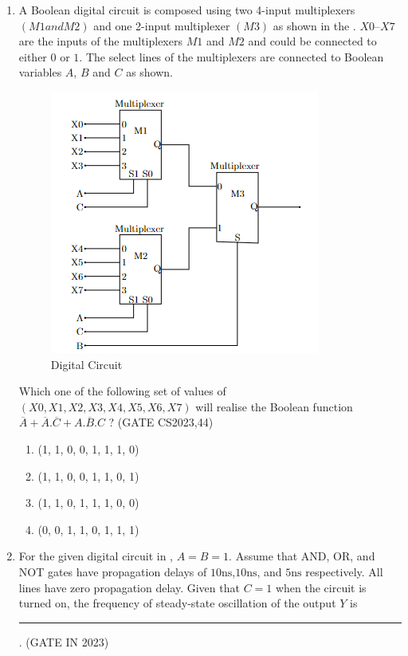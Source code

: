 \begin{enumerate}[label=\arabic*.,ref=\theenumi]
\item A Boolean digital circuit is composed using two 4-input multiplexers $(M1 and M2)$ and one 2-input multiplexer $(M3)$ as shown in the 
    .
	 $X0$–$X7$ are the inputs of the multiplexers $M1$ and $M2$ and could be connected to either $0$ or $1$. The select lines of the multiplexers are connected to Boolean variables $A$, $B$ and $C$ as shown.

\begin{figure}[!ht]
    \centering
        \includegraphics[width=\columnwidth]{figs/Multiplexer.png}
    \caption{Digital Circuit}
    \label{fig:Multiplexer}
\end{figure}

Which one of the following set of values of $(X0, X1, X2, X3, X4, X5, X6, X7)$ will realise the Boolean function 
$\overline{A} + \overline{A}.\overline{C}+A.\overline{B}.C $ ?
\hfill(GATE CS2023,44)
 \begin{enumerate}
     \item (1, 1, 0, 0, 1, 1, 1, 0)
     \item (1, 1, 0, 0, 1, 1, 0, 1)
     \item (1, 1, 0, 1, 1, 1, 0, 0)
     \item (0, 0, 1, 1, 0, 1, 1, 1)
 \end{enumerate}
\item For the given digital circuit
in	,
	 $A = B = 1$. Assume that AND, OR, and NOT gates have propagation delays of $10\mathrm{ns}$,$10\mathrm{ns}$, and $5\mathrm{ns}$ respectively. All lines have zero
propagation delay. Given that $C = 1$ when the circuit is turned on, the frequency of steady-state oscillation of the output $Y$  is  \rule{30pt}{1pt}.
\hfill (GATE IN 2023)
\begin{figure}[!ht]
        \centering  
        

\end{figure}
\end{enumerate}
